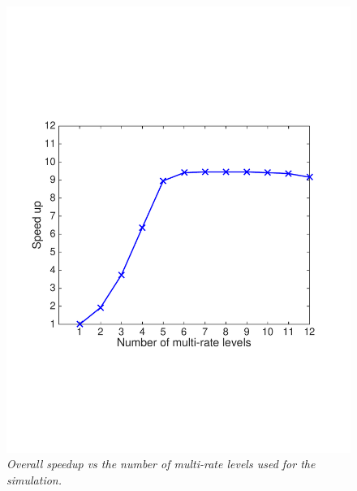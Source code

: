 \begin{figure}[h!]
\begin{center}
\includegraphics[trim=1cm 6cm 2cm 7cm,clip=true,width=0.5\linewidth]{./figures/timeVsLevelsWorldOcean.pdf}
\caption{\emph{Overall speedup vs the number of multi-rate levels used for
the simulation.}}
\label{fig:timeVsLevelsWorldOcean}
\end{center}
\end{figure}



